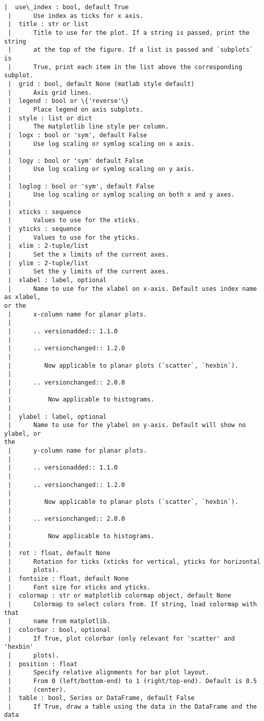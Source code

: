 \documentclass[11pt]{article}
\begin{document}
\begin{Verbatim}[commandchars=\\\{\}]
 |  use\_index : bool, default True
 |      Use index as ticks for x axis.
 |  title : str or list
 |      Title to use for the plot. If a string is passed, print the string
 |      at the top of the figure. If a list is passed and `subplots` is
 |      True, print each item in the list above the corresponding subplot.
 |  grid : bool, default None (matlab style default)
 |      Axis grid lines.
 |  legend : bool or \{'reverse'\}
 |      Place legend on axis subplots.
 |  style : list or dict
 |      The matplotlib line style per column.
 |  logx : bool or 'sym', default False
 |      Use log scaling or symlog scaling on x axis.
 |
 |  logy : bool or 'sym' default False
 |      Use log scaling or symlog scaling on y axis.
 |
 |  loglog : bool or 'sym', default False
 |      Use log scaling or symlog scaling on both x and y axes.
 |
 |  xticks : sequence
 |      Values to use for the xticks.
 |  yticks : sequence
 |      Values to use for the yticks.
 |  xlim : 2-tuple/list
 |      Set the x limits of the current axes.
 |  ylim : 2-tuple/list
 |      Set the y limits of the current axes.
 |  xlabel : label, optional
 |      Name to use for the xlabel on x-axis. Default uses index name as xlabel,
or the
 |      x-column name for planar plots.
 |
 |      .. versionadded:: 1.1.0
 |
 |      .. versionchanged:: 1.2.0
 |
 |         Now applicable to planar plots (`scatter`, `hexbin`).
 |
 |      .. versionchanged:: 2.0.0
 |
 |          Now applicable to histograms.
 |
 |  ylabel : label, optional
 |      Name to use for the ylabel on y-axis. Default will show no ylabel, or
the
 |      y-column name for planar plots.
 |
 |      .. versionadded:: 1.1.0
 |
 |      .. versionchanged:: 1.2.0
 |
 |         Now applicable to planar plots (`scatter`, `hexbin`).
 |
 |      .. versionchanged:: 2.0.0
 |
 |          Now applicable to histograms.
 |
 |  rot : float, default None
 |      Rotation for ticks (xticks for vertical, yticks for horizontal
 |      plots).
 |  fontsize : float, default None
 |      Font size for xticks and yticks.
 |  colormap : str or matplotlib colormap object, default None
 |      Colormap to select colors from. If string, load colormap with that
 |      name from matplotlib.
 |  colorbar : bool, optional
 |      If True, plot colorbar (only relevant for 'scatter' and 'hexbin'
 |      plots).
 |  position : float
 |      Specify relative alignments for bar plot layout.
 |      From 0 (left/bottom-end) to 1 (right/top-end). Default is 0.5
 |      (center).
 |  table : bool, Series or DataFrame, default False
 |      If True, draw a table using the data in the DataFrame and the data

\end{Verbatim}
\end{document}
